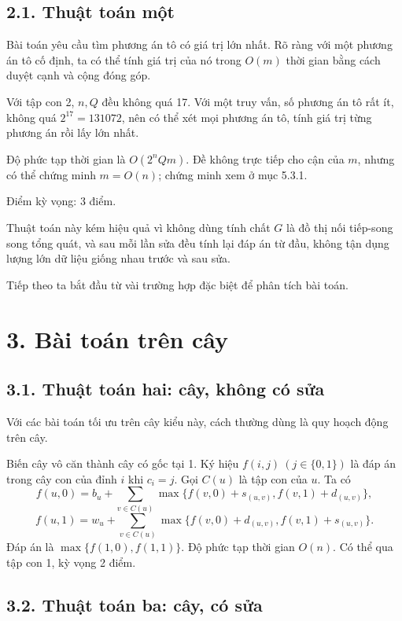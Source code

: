 \documentclass[11pt]{article}
\begin{document}
\subsection*{2.1. Thuật toán một}

Bài toán yêu cầu tìm phương án tô có giá trị lớn nhất. Rõ ràng với một phương
án tô cố định, ta có thể tính giá trị của nó trong \(O(m)\) thời gian bằng
cách duyệt cạnh và cộng đóng góp.

Với tập con 2, \(n,Q\) đều không quá 17. Với một truy vấn, số phương án tô rất
ít, không quá \(2^{17}=131072\), nên có thể xét mọi phương án tô, tính giá trị
từng phương án rồi lấy lớn nhất.

Độ phức tạp thời gian là \(O(2^n Qm)\). Đề không trực tiếp cho cận của \(m\),
nhưng có thể chứng minh \(m=O(n)\); chứng minh xem ở mục 5.3.1.

Điểm kỳ vọng: 3 điểm.

Thuật toán này kém hiệu quả vì không dùng tính chất \(G\) là đồ thị nối
tiếp-song song tổng quát, và sau mỗi lần sửa đều tính lại đáp án từ đầu,
không tận dụng lượng lớn dữ liệu giống nhau trước và sau sửa.

Tiếp theo ta bắt đầu từ vài trường hợp đặc biệt để phân tích bài toán.

\section*{3. Bài toán trên cây}

\subsection*{3.1. Thuật toán hai: cây, không có sửa}

Với các bài toán tối ưu trên cây kiểu này, cách thường dùng là quy hoạch động
trên cây.

Biến cây vô căn thành cây có gốc tại 1. Ký hiệu \(f(i,j)\ (j\in\{0,1\})\) là
đáp án trong cây con của đỉnh \(i\) khi \(c_i=j\). Gọi \(C(u)\) là tập con của
\(u\). Ta có
\[
  f(u,0)=b_u+\sum_{v\in C(u)}
  \max\{f(v,0)+s_{(u,v)}, f(v,1)+d_{(u,v)}\},
\]
\[
  f(u,1)=w_u+\sum_{v\in C(u)}
  \max\{f(v,0)+d_{(u,v)}, f(v,1)+s_{(u,v)}\}.
\]
Đáp án là \(\max\{f(1,0),f(1,1)\}\). Độ phức tạp thời gian \(O(n)\). Có thể
qua tập con 1, kỳ vọng 2 điểm.

\subsection*{3.2. Thuật toán ba: cây, có sửa}
\end{document}
